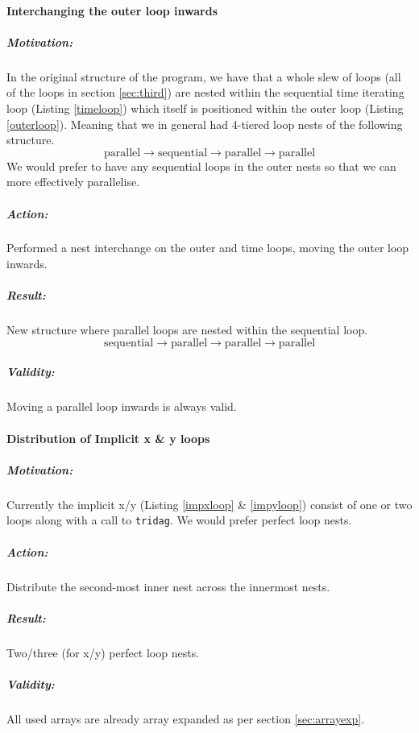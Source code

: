 \paragraph{Interchanging the outer loop inwards}
\subparagraph{Motivation:} In the original structure of the program, we have that a whole slew of loops
 (all of the loops in section \ref{sec:third}) are nested
 within the sequential time iterating loop (Listing \ref{timeloop}) which itself is positioned within
 the outer loop (Listing \ref{outerloop}). Meaning that we in general had 4-tiered loop nests of the following
 structure.
$$\mathrm{parallel} \to \mathrm{sequential} \to \mathrm{parallel} \to \mathrm{parallel}$$
We would prefer to have any sequential loops in the outer nests so that we can more effectively
 parallelise.
\subparagraph{Action:} Performed a nest interchange on the outer and time loops, moving the outer loop inwards.
\subparagraph{Result:} New structure where parallel loops are nested within the sequential loop.
$$\mathrm{sequential} \to \mathrm{parallel} \to \mathrm{parallel} \to \mathrm{parallel}$$
\subparagraph{Validity:} Moving a parallel loop inwards is always valid.

\paragraph{Distribution of Implicit x \& y loops}
\subparagraph{Motivation:} Currently the implicit x/y (Listing \ref{impxloop} \& \ref{impyloop}) consist of one or two loops along with a call
 to \verb!tridag!. We would prefer perfect loop nests.
\subparagraph{Action:} Distribute the second-most inner nest across the innermost nests.
\subparagraph{Result:} Two/three (for x/y) perfect loop nests.
\subparagraph{Validity:} All used arrays are already array expanded as per section \ref{sec:arrayexp}.
